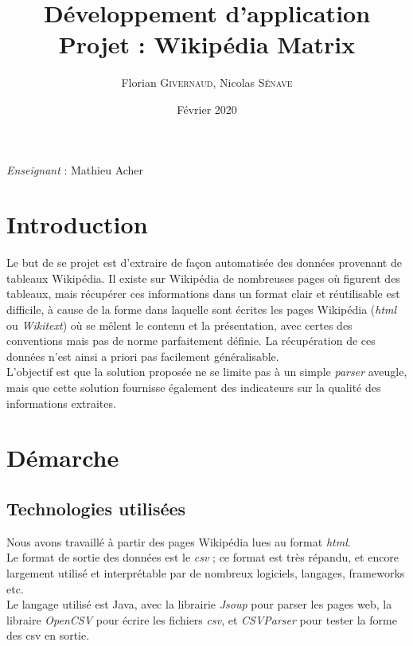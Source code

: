 \documentclass[french]{article}
\title{Développement d'application \\ Projet : Wikipédia Matrix}
\date{Février 2020}
\author{Florian \textsc{Givernaud}, Nicolas \textsc{Sénave}}
\begin{document}
\large
\noindent

\maketitle

\textit{Enseignant} : Mathieu Acher

\section{Introduction}

Le but de se projet est d'extraire de façon automatisée des données provenant de tableaux Wikipédia. Il existe sur Wikipédia de nombreuses pages où figurent des tableaux, mais récupérer ces informations dans un format clair et réutilisable est difficile, à cause de la forme dans laquelle sont écrites les pages Wikipédia (\textit{html} ou \textit{Wikitext}) où se mêlent le contenu et la présentation, avec certes des conventions mais pas de norme parfaitement définie. La récupération de ces données n'est ainsi a priori pas facilement généralisable.\\

L'objectif est que la solution proposée ne se limite pas à un simple \textit{parser} aveugle, mais que cette solution fournisse également des indicateurs sur la qualité des informations extraites.

\section{Démarche}

\subsection{Technologies utilisées}

Nous avons travaillé à partir des pages Wikipédia lues au format \textit{html}.\\

Le format de sortie des données est le \textit{csv} ; ce format est très répandu, et encore largement utilisé et interprétable par de nombreux logiciels, langages, frameworks etc.\\

Le langage utilisé est Java, avec la librairie \textit{Jsoup} pour parser les pages web, la libraire \textit{OpenCSV} pour écrire les fichiers \textit{csv}, et \textit{CSVParser} pour tester la forme des csv en sortie.\\
\end{document}
